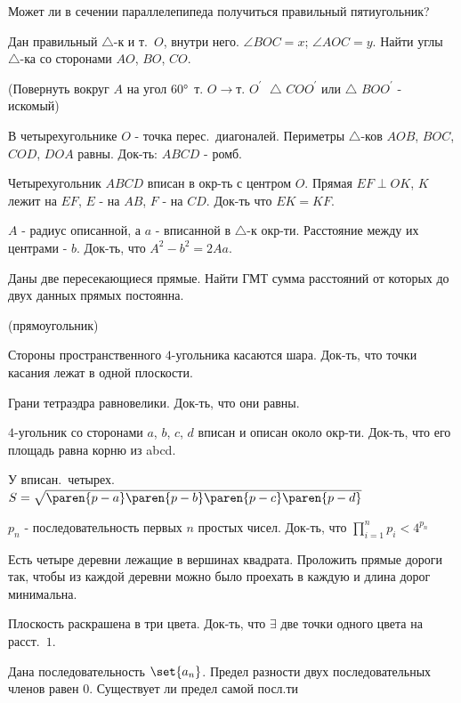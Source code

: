 \documentclass{article}
\newcommand{\strikethrough}[1]{}  %
\begin{document}
\problem  %
Может ли в сечении параллелепипеда получиться правильный пятиугольник?


\problem  %
Дан правильный \strikethrough{многоугольник} $\triangle$-к и т.\ $O$, внутри него.
$\angle BOC = x$; $\angle AOC = y$.
Найти углы $\triangle$-ка со сторонами $AO$, $BO$, $CO$.

(Повернуть вокруг $A$ на угол $\ang{60} \,$
$\text{т.\ } O \to \text{т.\ } O^{\prime}$
$\; \triangle$ $COO^{\prime}$ или $\triangle$ $BOO^{\prime}$ - искомый)


\problem  %
В четырехугольнике $O$ - точка перес.\ диагоналей.
Периметры $\triangle$-ков $AOB$, $BOC$, $COD$, $DOA$ равны.
Док-ть: $ABCD$ - ромб.


\problem  %
Четырехугольник $ABCD$ вписан в окр-ть с центром $O$.
Прямая $EF \perp OK$, $K$ лежит на $EF$, $E$ - на $AB$, $F$ - на $CD$.
Док-ть что $EK = KF$.


\problem  %
$A$ - радиус описанной, а $a$ - вписанной в $\triangle$-к окр-ти.
Расстояние между их центрами - $b$.
Док-ть, что $A^2 - b^2 = 2 A a$.


\problem  %
Даны две пересекающиеся прямые.
Найти ГМТ сумма расстояний от которых до двух данных прямых постоянна.

(прямоугольник)


\problem  %
Стороны пространственного $4$-угольника касаются шара.
Док-ть, что точки касания лежат в одной плоскости.


\problem  %
Грани тетраэдра равновелики.
Док-ть, что они равны.


\problem  %
$4$-угольник со сторонами $a$, $b$, $c$, $d$ вписан и описан около окр-ти.
Док-ть, что его площадь равна корню из abcd.

У вписан.\ четырех.\ $S = \sqrt{\paren{p - a} \paren{p - b} \paren{p - c} \paren{p - d}}$


\problem  %
$p_n$ - последовательность первых $n$ простых чисел.
Док-ть, что $\displaystyle{\prod\limits_{i = 1}^n {p_i} < 4^{p_n}}$


\problem  %
Есть четыре деревни лежащие в вершинах квадрата.
Проложить прямые дороги так, чтобы из каждой деревни можно было проехать в каждую и длина дорог минимальна.


\problem  %
Плоскость раскрашена в три цвета.
Док-ть, что $\exists$ две точки одного цвета на расст.\ $1$.


\problem  %
Дана последовательность $\set{a_n}$.
Предел разности двух последовательных членов равен $0$.
Существует ли предел самой посл.ти
\end{document}
